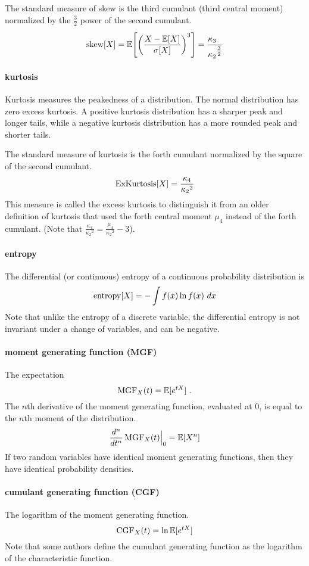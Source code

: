 The standard measure of skew is the third cumulant (third central moment) normalized by the $\tfrac{3}{2}$ power of the second cumulant.
\[
\op{skew}[X]    
= \expect\Left[ \Left( \frac{X-\expect[X]} {{\sigma}[X]} \Right)^3 \Right]
= \frac{\kappa_3\phantom{^{\tfrac{3}{2}}}}{{\kappa_2}^{\tfrac{3}{2}}}
\checked
\notag 
\]


\paragraph*{kurtosis}  Kurtosis measures the peakedness of a distribution. The normal distribution has zero excess kurtosis. A positive kurtosis distribution has a sharper peak and longer tails, while a negative kurtosis distribution has a more rounded peak and shorter tails.

The standard measure of kurtosis is the forth cumulant normalized by the square of the second cumulant.
\[
\operatorname{ExKurtosis}[X] = \frac{\kappa_4}{{\kappa_2}^{2}} 
\notag
\]
This measure is called the excess kurtosis to distinguish it from an older definition of kurtosis that used the forth central moment $\mu_4$ instead of the forth cumulant. (Note that  $\tfrac{\kappa_4}{{\kappa_2}^{2}} =  \frac{\mu_4}{{\kappa_2}^{2}} -3$\checked).


\paragraph*{entropy} 
The differential (or continuous) entropy of a continuous probability distribution is
\[
\operatorname{entropy}[X] = - \int f(x) \ln f(x)\  dx  
\notag
\]
Note that unlike the entropy of a discrete variable, the differential entropy is not invariant under a change of variables, and can be negative. 

\paragraph*{moment generating function (MGF) } 
The expectation
\[
\operatorname{MGF}_X(t) = \operatorname{\mathbb E}[e^{t X}]  \ . 
\notag
\]
The $n$th derivative of the moment generating function, evaluated at $0$, is equal to the $n$th moment of the distribution. 
\[
\frac{d^n}{dt^n}\operatorname{MGF}_X(t)\Big|_0 = \operatorname{\mathbb E}[X^n]  
\notag
\]
If two random variables have identical moment generating functions, then they have identical probability densities.


\paragraph*{cumulant generating function (CGF) }
\label{CGF}
The logarithm of the moment generating function.
\[
\operatorname{CGF}_X(t) = \ln \operatorname{\mathbb E}[e^{t X}] 
\notag
\]
Note that some authors define the cumulant generating function as the logarithm of the characteristic function.

